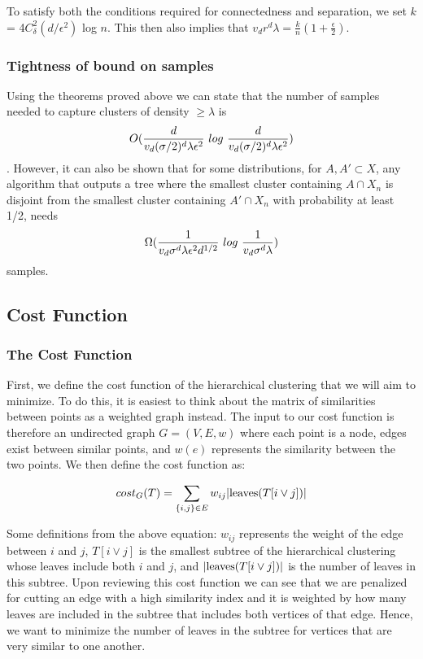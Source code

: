 \documentclass{article}
\begin{document}
To satisfy both the conditions required for connectedness and separation, we set $k$ = 4$C_{\delta}^2(d/\epsilon^2)$ log $n$.  This then also implies that $v_dr^d\lambda  = \frac{k}{n}(1+\frac{\epsilon}{2})$.

\subsubsection{Tightness of bound on samples}
Using the theorems proved above we can state that the number of samples needed to capture clusters of density $\geq \lambda$ is $$O(\frac{d}{v_d(\sigma/2)^d\lambda\epsilon^2} \-\ log \-\ \frac{d}{v_d(\sigma/2)^d\lambda\epsilon^2})$$.  However, it can also be shown that for some distributions, for  $A, A' \subset X$, any algorithm that outputs a tree where the smallest cluster containing $A \cap X_n$ is disjoint from the smallest cluster containing $A' \cap X_n$ with probability at least 1/2, needs $$\Omega(\frac{1}{v_d\sigma^d\lambda\epsilon^2d^{1/2}} \-\ log \-\ \frac{1}{v_d\sigma^d\lambda})$$ samples.


\subsection{Cost Function}

\subsubsection{The Cost Function}

First, we define the cost function of the hierarchical clustering that we will aim to minimize. To do this, it is easiest to think about the matrix of similarities between points as a weighted graph instead. The input to our cost function is therefore an undirected graph $G = (V, E, w)$ where each point is a node, edges exist between similar points, and $w(e)$ represents the similarity between the two points. We then define the cost function as:

$$cost_G(T) = \sum_{\{i, j\} \in E}w_{ij}|\hbox{leaves}(T[i \vee j])|$$

Some definitions from the above equation: $w_{ij}$ represents the weight of the edge between $i$ and $j$, $T[i \vee j]$ is the smallest subtree of the hierarchical clustering whose leaves include both $i$ and $j$, and $|\hbox{leaves}(T[i \vee j])|$ is the number of leaves in this subtree. Upon reviewing this cost function we can see that we are penalized for cutting an edge with a high similarity index and it is weighted by how many leaves are included in the subtree that includes both vertices of that edge. Hence, we want to minimize the number of leaves in the subtree for vertices that are very similar to one another.
\end{document}
